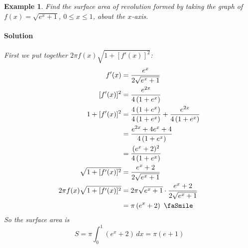 \documentclass[letterpaper, 11pt, openany]{book}
\theoremstyle{mytheoremstyle}
\theoremstyle{myexamplestyle}
\newtheorem{example}{Example}[section]
\newenvironment{solution}{\paragraph{\sffamily \smaller \fontseries{b}\selectfont Solution}}{\hfill\faSquare}
\begin{document}
\begin{example}
    Find the surface area of revolution formed by taking the graph of $f(x) = \sqrt{e^{x} + 1}$, $0 \leq x \leq 1$, about the $x$-axis.
    
    \begin{solution}
        First we put together $2\pi f(x) \sqrt{1 + [f'(x)]^{2}}$:
        \begin{align*}
            f'(x) &= \frac{e^{x}}{2\sqrt{e^{x} + 1}}\\
            [f'(x)]^{2} &= \frac{e^{2x}}{4\left( 1 + e^{x} \right)}\\
            1 + [f'(x)]^{2} &= \frac{4\left( 1 + e^{x} \right)}{4\left( 1 + e^{x} \right)} + \frac{e^{2x}}{4\left( 1 + e^{x} \right)}\\
            & = \frac{e^{2x} + 4e^{x} + 4}{4\left( 1 + e^{x} \right)}\\
            &= \frac{(e^{x} + 2)^{2}}{4\left( 1 + e^{x} \right)}\\
            \sqrt{1 + [f'(x)]^{2}} &= \frac{e^{x} + 2}{2\sqrt{e^{x} + 1}}\\
            2\pi f(x) \sqrt{1 + [f'(x)]^{2}} & = 2\pi \sqrt{e^{x} + 1} \cdot \frac{e^{x} + 2}{2\sqrt{e^{x} + 1}} \\
            &= \pi \left( e^{x}  + 2 \right) \text{ \faSmile}
        \end{align*}
        So the surface area is
        \[S = \pi \int_{0}^{1} \left( e^{x}  + 2 \right)\, dx = \pi \left( e + 1 \right)\]
    \end{solution}
\end{example}
\end{document}
